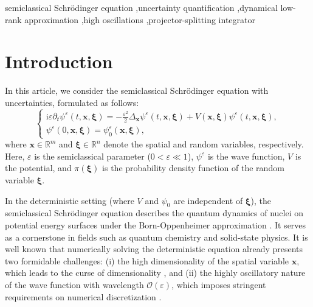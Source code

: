 \documentclass[preprint,11pt]{elsarticle}
\begin{document}
\begin{keyword}
semiclassical Schr\"odinger equation \sep uncertainty quantification \sep dynamical low-rank approximation \sep high oscillations \sep projector-splitting integrator
\end{keyword}

\maketitle

\section{Introduction}

In this article, we consider the semiclassical Schrödinger equation with uncertainties, formulated as follows:
\begin{equation}
\label{Schro-equation}
\begin{cases}
\mathrm{i} \varepsilon \partial_t \psi^{\varepsilon}(t, \bm{x}, \bm{\xi}) = -\frac{\varepsilon^{2}}{2} \Delta_{\bm{x}} \psi^{\varepsilon}(t, \bm{x}, \bm{\xi}) + V(\bm{x}, \bm{\xi}) \psi^{\varepsilon}(t, \bm{x}, \bm{\xi}), \\
\psi^{\varepsilon}(0, \bm{x}, \bm{\xi}) = \psi^{\varepsilon}_{0}(\bm{x}, \bm{\xi}), 
\end{cases}
\end{equation}
where $\bm{x} \in \mathbb{R}^m$ and $\bm{\xi} \in \mathbb{R}^n$ denote the spatial and random variables, respectively. Here, $\varepsilon$ is the semiclassical parameter ($0 < \varepsilon \ll 1$), $\psi^{\varepsilon}$ is the wave function, $V$ is the potential, and $\pi(\bm{\xi})$ is the probability density function of the random variable $\bm{\xi}$. 

In the deterministic setting (where $V$ and $\psi_0$ are independent of $\bm{\xi}$), the semiclassical Schrödinger equation describes the quantum dynamics of nuclei on potential energy surfaces under the Born-Oppenheimer approximation %
\cite{lasserComputingQuantumDynamics2020}. 
It serves as a cornerstone in fields such as quantum chemistry and solid-state physics. It is well known that numerically solving the deterministic equation already presents two formidable challenges: (i) the high dimensionality of the spatial variable $\bm{x}$, which leads to the curse of dimensionality , and (ii) the highly oscillatory nature of the wave function with wavelength $\mathcal{O}(\varepsilon)$, which imposes stringent requirements on numerical discretization \cite{jinMathematicalComputationalMethods2011}. 
\end{document}
